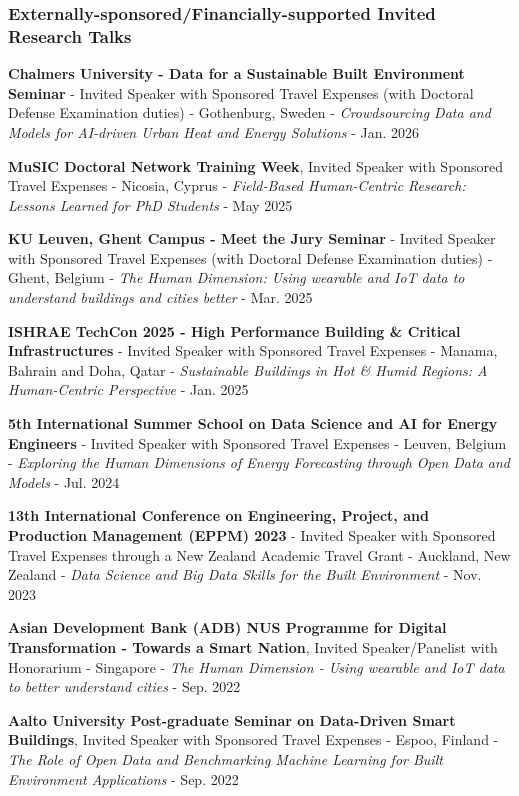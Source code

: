 \documentclass[10pt,a4paper]{article}
\begin{document}
\begin{small}
\subsubsection*{Externally-sponsored/Financially-supported Invited Research Talks}
\begin{etaremune}
\item
\textbf{Chalmers University - Data for a Sustainable Built Environment Seminar} - Invited Speaker with Sponsored Travel Expenses (with Doctoral Defense Examination duties) - Gothenburg, Sweden - \emph{Crowdsourcing Data and Models for AI-driven Urban Heat and Energy Solutions} - Jan. 2026
\item
\textbf{MuSIC Doctoral Network Training Week}, Invited Speaker with Sponsored Travel Expenses - Nicosia, Cyprus - \emph{Field-Based Human-Centric Research: Lessons Learned for PhD Students} - May 2025
\item
\textbf{KU Leuven, Ghent Campus - Meet the Jury Seminar} - Invited Speaker with Sponsored Travel Expenses (with Doctoral Defense Examination duties) - Ghent, Belgium - \emph{The Human Dimension: Using wearable and IoT data to understand buildings and cities better} - Mar. 2025
\item
\textbf{ISHRAE TechCon 2025 - High Performance Building \& Critical Infrastructures} - Invited Speaker with Sponsored Travel Expenses - Manama, Bahrain and Doha, Qatar - \emph{Sustainable Buildings in Hot \& Humid Regions: A Human-Centric Perspective} - Jan. 2025
\item
\textbf{5th International Summer School on Data Science and AI for Energy Engineers} - Invited Speaker with Sponsored Travel Expenses - Leuven, Belgium - \emph{Exploring the Human Dimensions of Energy Forecasting through Open Data and Models} - Jul. 2024
\item
\textbf{13th International Conference on Engineering, Project, and Production Management (EPPM) 2023} - Invited Speaker with Sponsored Travel Expenses through a New Zealand Academic Travel Grant - Auckland, New Zealand - \emph{Data Science and Big Data Skills for the Built Environment} - Nov. 2023
\item
\textbf{Asian Development Bank (ADB) NUS Programme for Digital Transformation - Towards a Smart Nation}, Invited Speaker/Panelist with Honorarium - Singapore - \emph{The Human Dimension - Using wearable and IoT data to better understand cities} - Sep. 2022
\item
\textbf{Aalto University Post-graduate Seminar on Data-Driven Smart Buildings}, Invited Speaker with Sponsored Travel Expenses - Espoo, Finland - \emph{The Role of Open Data and Benchmarking Machine Learning for Built Environment Applications} - Sep. 2022

\end{etaremune}
\end{small}
\end{document}
